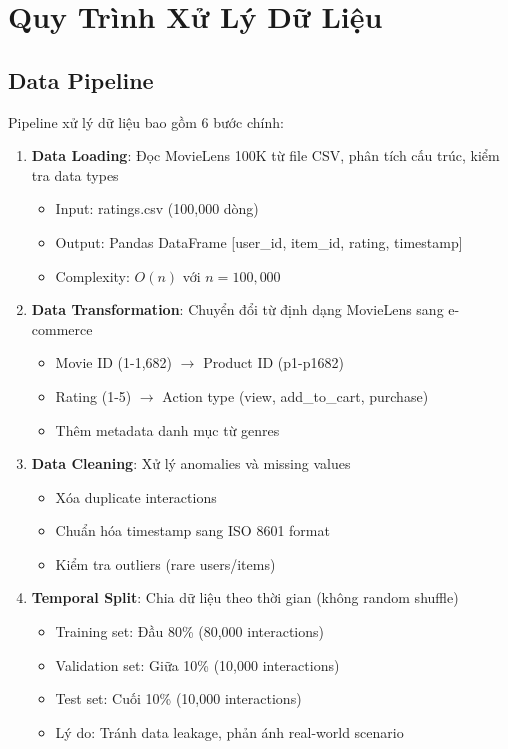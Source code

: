 \documentclass[12pt,a4paper]{article}
\begin{document}
\section{Quy Trình Xử Lý Dữ Liệu}

\subsection{Data Pipeline}

Pipeline xử lý dữ liệu bao gồm 6 bước chính:

\begin{enumerate}
    \item \textbf{Data Loading}: Đọc MovieLens 100K từ file CSV, phân tích cấu trúc, kiểm tra data types
    \begin{itemize}
        \item Input: ratings.csv (100,000 dòng)
        \item Output: Pandas DataFrame [user\_id, item\_id, rating, timestamp]
        \item Complexity: $O(n)$ với $n = 100,000$
    \end{itemize}
    
    \item \textbf{Data Transformation}: Chuyển đổi từ định dạng MovieLens sang e-commerce
    \begin{itemize}
        \item Movie ID (1-1,682) $\rightarrow$ Product ID (p1-p1682)
        \item Rating (1-5) $\rightarrow$ Action type (view, add\_to\_cart, purchase)
        \item Thêm metadata danh mục từ genres
    \end{itemize}
    
    \item \textbf{Data Cleaning}: Xử lý anomalies và missing values
    \begin{itemize}
        \item Xóa duplicate interactions
        \item Chuẩn hóa timestamp sang ISO 8601 format
        \item Kiểm tra outliers (rare users/items)
    \end{itemize}
    
    \item \textbf{Temporal Split}: Chia dữ liệu theo thời gian (không random shuffle)
    \begin{itemize}
        \item Training set: Đầu 80\% (80,000 interactions)
        \item Validation set: Giữa 10\% (10,000 interactions)
        \item Test set: Cuối 10\% (10,000 interactions)
        \item Lý do: Tránh data leakage, phản ánh real-world scenario
    \end{itemize}
    

\end{enumerate}
\end{document}
